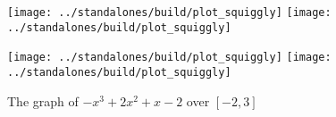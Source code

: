 \documentclass[../main]{subfiles}
\begin{document}
%
%
%
%
%

\pagestyle{empty}
\begin{figure}[h!]  %
\centering

\texttt{[image: ../standalones/build/plot\_squiggly]}
\hspace{2em}
\texttt{[image: ../standalones/build/plot\_squiggly]}

\vspace{2em}

\texttt{[image: ../standalones/build/plot\_squiggly]}
\hspace{2em}
\texttt{[image: ../standalones/build/plot\_squiggly]}

\caption{The graph of \(-x^{3} + 2 x^{2} + x - 2\) over \([-2,3]\)}
\label{fig:squiggly}
\end{figure}
\end{document}
